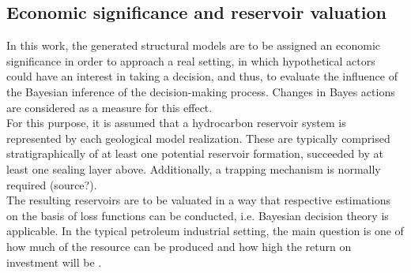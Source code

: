         \subsection{Economic significance and reservoir valuation}\label{sec:Reservoir_values}
        In this work, the generated structural models are to be assigned an economic significance in order to approach a real setting, in which hypothetical actors could have an interest in taking a decision, and thus, to evaluate the influence of the Bayesian inference of the decision-making process. Changes in Bayes actions are considered as a measure for this effect.\\
        For this purpose, it is assumed that a hydrocarbon reservoir system is represented by each geological model realization. These are typically comprised stratigraphically of at least one potential reservoir formation, succeeded by at least one sealing layer above. Additionally, a trapping mechanism is normally required (source?).\\
        The resulting reservoirs are to be valuated in a way that respective estimations on the basis of loss functions can be conducted, i.e. Bayesian decision theory is applicable. In the typical petroleum industrial setting, the main question is one of how much of the resource can be produced and how high the return on investment will be \citep{dean2007volumetric}.
        
